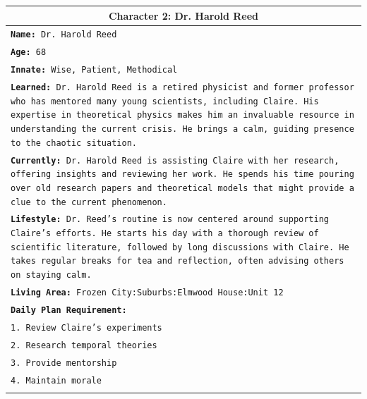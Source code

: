 \documentclass[letterpaper]{article} %
\begin{document}
\begin{small}
\begin{longtable}{p{\textwidth}}
    \multicolumn{1}{c}{\textbf{Character 2: Dr. Harold Reed}} \\
    \midrule
    \texttt{\textbf{Name:} Dr. Harold Reed} \\
    \texttt{\textbf{Age:} 68} \\
    \texttt{\textbf{Innate:} Wise, Patient, Methodical} \\
    \texttt{\textbf{Learned:} Dr. Harold Reed is a retired physicist and former professor who has mentored many young scientists, including Claire. His expertise in theoretical physics makes him an invaluable resource in understanding the current crisis. He brings a calm, guiding presence to the chaotic situation.} \\
    \texttt{\textbf{Currently:} Dr. Harold Reed is assisting Claire with her research, offering insights and reviewing her work. He spends his time pouring over old research papers and theoretical models that might provide a clue to the current phenomenon.} \\
    \texttt{\textbf{Lifestyle:} Dr. Reed's routine is now centered around supporting Claire's efforts. He starts his day with a thorough review of scientific literature, followed by long discussions with Claire. He takes regular breaks for tea and reflection, often advising others on staying calm.} \\
    \texttt{\textbf{Living Area:} Frozen City:Suburbs:Elmwood House:Unit 12} \\
    \texttt{\textbf{Daily Plan Requirement:}} \\
    \texttt{1. Review Claire's experiments} \\
    \texttt{2. Research temporal theories} \\
    \texttt{3. Provide mentorship} \\
    \texttt{4. Maintain morale} \\
    \\
    \midrule


\end{longtable}
\end{small}
\end{document}
